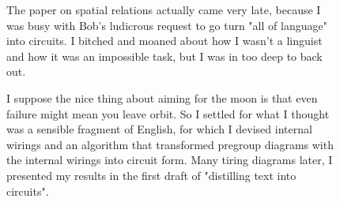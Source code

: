 \begin{figure}[h!]
\centering
{}
\end{figure}

\begin{figure}[h!]
\centering
{}
\caption{The paper on spatial relations actually came very late, because I was busy with Bob's ludicrous request to go turn "all of language" into circuits. I bitched and moaned about how I wasn't a linguist and how it was an impossible task, but I was in too deep to back out.}
\end{figure}

\begin{figure}[h!]
\centering
{}
\caption{I suppose the nice thing about aiming for the moon is that even failure might mean you leave orbit. So I settled for what I thought was a sensible fragment of English, for which I devised internal wirings and an algorithm that transformed pregroup diagrams with the internal wirings into circuit form. Many tiring diagrams later, I presented my results in the first draft of "distilling text into circuits".}
\end{figure}

